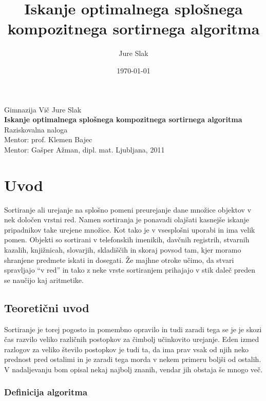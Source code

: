 \documentclass[a4paper,oneside]{article}
\title{Iskanje optimalnega splošnega kompozitnega sortirnega algoritma}
\author{Jure Slak}
\date{\today}
\begin{document}
\addto\captionsslovene {
\renewcommand\bibname{}
}
\renewcommand\refname{}


\thispagestyle{empty}

\begin{center}{\large
  Gimnazija Vič
  \vfill
  {\Large Jure Slak}\\[20mm]
  {\bf \huge Iskanje optimalnega splošnega kompozitnega sortirnega algoritma}\\[10mm]
  Raziskovalna naloga\\[1cm]
  Mentor: prof. Klemen Bajec \\[2mm]
  Mentor: Gašper Ažman, dipl. mat.}
  \vfill
  \vfill
  \large Ljubljana, 2011
\end{center}
\pagebreak

\thispagestyle{empty}
\tableofcontents
\pagebreak

\section{Uvod}
\label{chapter:uvod}

Sortiranje ali urejanje na splošno pomeni preurejanje dane množice objektov
v nek določen vrstni red.
Namen sortiranja je ponavadi olajšati kasnejše iskanje pripadnikov take urejene množice. Kot tako je
v vsesplošni uporabi in ima velik pomen. Objekti so sortirani v telefonskih imenikih,
davčnih registrih, stvarnih kazalih, knjižnicah, slovarjih, skladiščih in skoraj povsod tam,
kjer moramo shranjene predmete iskati in dosegati. Že majhne otroke učimo, da stvari spravljajo
``v red'' in tako z neke vrste sortiranjem prihajajo v stik daleč preden se naučijo kaj
aritmetike.

\subsection{Teoretični uvod}
\label{chapter:teoreticni}
Sortiranje je torej pogosto in pomembno opravilo in tudi zaradi tega se je je skozi čas
razvilo veliko različnih postopkov za čimbolj učinkovito urejanje. Eden izmed razlogov za
veliko število postopkov je tudi ta, da ima prav vsak od njih neko prednost pred ostalimi in je
zaradi tega morda v nekem primeru boljši od ostalih. V nadaljevanju bom opisal nekaj najbolj znanih, 
vendar jih obstaja še mnogo več. 

\subsubsection{Definicija algoritma}
\end{document}
